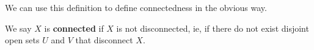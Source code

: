 We can use this definition to define connectedness in the obvious way.

\begin{boxdefinition}[Connectedness]
    We say $X$ is \textbf{connected} if $X$ is not disconnected, ie, if there do not exist disjoint open sets $U$ and $V$ that disconnect $X$.
\end{boxdefinition}


